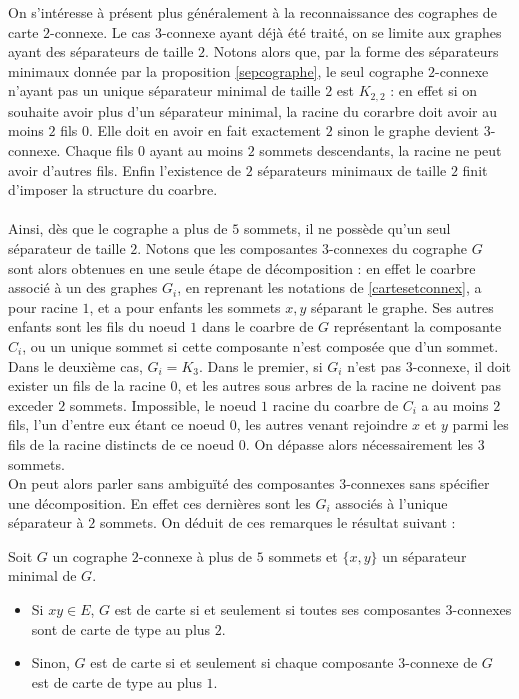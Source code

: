 \documentclass{scrartcl}
\begin{document}
\begin{flushleft}
On s'intéresse à présent plus généralement à la reconnaissance des cographes de carte $2$-connexe. Le cas $3$-connexe ayant déjà été traité,
on se limite aux graphes ayant des séparateurs de taille $2$. Notons alors que, par la forme des séparateurs minimaux donnée par la proposition
\ref{sepcographe}, le seul cographe $2$-connexe n'ayant pas un unique séparateur minimal de taille $2$ est $K_{2,2}$ : en effet si on souhaite avoir
plus d'un séparateur minimal, la racine du corarbre doit avoir au moins $2$ fils $0$. Elle doit en avoir en fait exactement $2$ sinon le
graphe devient $3$-connexe. Chaque fils $0$ ayant au moins $2$ sommets descendants, la racine ne peut avoir d'autres fils. Enfin l'existence
de $2$ séparateurs minimaux de taille $2$ finit d'imposer la structure du coarbre.
\\~\\
Ainsi, dès que le cographe a plus de $5$ sommets, il ne possède qu'un seul séparateur de taille $2$. Notons que les composantes $3$-connexes
du cographe $G$ sont alors obtenues en une seule étape de décomposition : en effet le coarbre associé à un des graphes $G_i$, en reprenant
les notations de \ref{cartesetconnex}, a pour racine $1$, et a pour enfants les sommets $x,y$ séparant le graphe.
Ses autres enfants sont les fils du noeud $1$ dans le coarbre de $G$ représentant la composante $C_i$, ou un unique sommet si
cette composante n'est composée que d'un sommet. Dans le deuxième cas, $G_i = K_3$. Dans le premier, si $G_i$ n'est pas $3$-connexe,
il doit exister un fils de la racine $0$, et les autres sous arbres de la racine ne doivent pas exceder $2$ sommets. Impossible,
le noeud $1$ racine du coarbre de $C_i$ a au moins $2$ fils, l'un d'entre eux étant ce noeud $0$, les autres venant rejoindre $x$ et $y$
parmi les fils de la racine distincts de ce noeud $0$. On dépasse alors nécessairement les $3$ sommets.\\
On peut alors parler sans ambiguïté des composantes $3$-connexes sans spécifier une décomposition. En effet ces dernières sont
les $G_i$ associés à l'unique séparateur à $2$ sommets. On déduit de ces remarques le résultat suivant :

\begin{theorem}\label{cographe2conn}
    Soit $G$ un cographe $2$-connexe à plus de $5$ sommets et $\{x,y\}$ un séparateur minimal de $G$. 
    \begin{itemize}
        \item Si $xy \in E$, $G$ est de carte si et seulement si toutes ses composantes $3$-connexes sont de carte de type au plus $2$.
        \item Sinon, $G$ est de carte si et seulement si chaque composante $3$-connexe de $G$ est de carte de type au plus $1$.
    \end{itemize}
\end{theorem}


\end{flushleft}
\end{document}
